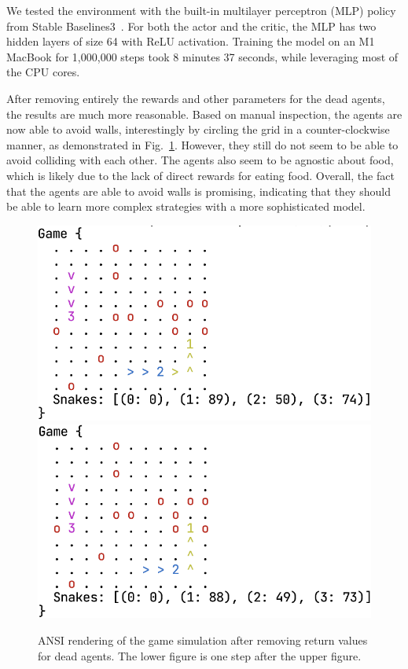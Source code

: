 \documentclass[conference]{IEEEtran}
\begin{document}
We tested the environment with the built-in multilayer perceptron (MLP)
policy from Stable Baselines3~\cite{raffin2024stable}.
For both the actor and the critic,
the MLP has two hidden layers of size 64 with ReLU activation.
Training the model on an M1 MacBook for 1,000,000 steps took 8 minutes 37
seconds, while leveraging most of the CPU cores.

After removing entirely the rewards and other parameters for the dead agents,
the results are much more reasonable. Based on manual inspection,
the agents are now able to avoid walls,
interestingly by circling the grid in a counter-clockwise manner,
as demonstrated in Fig.~\ref{fig:render2}. However,
they still do not seem to be able to avoid colliding with each other.
The agents also seem to be agnostic about food,
which is likely due to the lack of direct rewards for eating food. Overall,
the fact that the agents are able to avoid walls is promising,
indicating that they should be able to learn more complex strategies with a more
sophisticated model.

\begin{figure}
    \centering
    \includegraphics[width=\linewidth]{game_render_eg2.png}\\[12pt]
    \includegraphics[width=\linewidth]{game_render_eg3.png}
    \caption{ANSI rendering of the game simulation after removing return values
        for dead agents. The lower figure is one step after the upper figure.
    }
    \label{fig:render2}
\end{figure}
\end{document}
